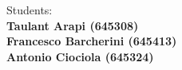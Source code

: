 \begin{titlepage}
\begin{minipage}[t]{0.47\textwidth}
\end{minipage}
\hfill
\begin{minipage}[t]{0.51\textwidth}\raggedleft
	{\large{Students:}
            {\normalsize\vspace{3mm} \bf\\ \large{Taulant Arapi (645308)}}
            {\normalsize\vspace{3mm} \bf\\ \large{Francesco Barcherini (645413)}}
            {\normalsize\vspace{3mm} \bf\\ \large{Antonio Ciociola (645324)}}
        }
            
\end{minipage}

\vspace{30mm}
\hrulefill
\\

\end{titlepage}











